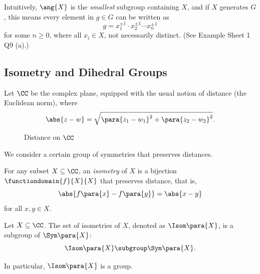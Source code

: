 \begin{remark}
    Intuitively, \(\ang{X}\) is the \emph{smallest} subgroup containing \(X\), and if \(X\) generates \(G\), this means every element in \(g \in G\) can be written as
    \[
        g = x_1^{\pm 1} \cdot x_2^{\pm 1} \cdots x_n^{\pm 1}
    \]
    for some \(n \geq 0\), where all \(x_i \in X\), not necessarily distinct. (See Example Sheet 1 Q9 (a).)
\end{remark}

\subsection{Isometry and Dihedral Groups}
\label{sec:isometry-and-dihedral-groups}

Let \(\CC\) be the complex plane, equipped with the usual notion of distance (the Euclidean norm), where
\[
    \abs{z - w} = \sqrt{\para{z_1 - w_1}^2 + \para{z_2 - w_2}^2}.
\]

\begin{figure}[ht!]
    \centering
    \caption{Distance on \(\CC\)}
    \label{fig:distance-on-C}
\end{figure}

We consider a certain group of symmetries that preserves distances.

\begin{definition}[Isometry]
    \label{def:isometry}%
    For any subset \(X \subseteq \CC\), an \emph{isometry} of \(X\) is a bijection \(\functiondomain{f}{X}{X}\) that preserves distance, that is,
    \[
        \abs{f\para{x} - f\para{y}} = \abs{x - y}
    \]
    for all \(x, y \in X\).
\end{definition}

\begin{proposition}
    \label{prop:isometry-group-in-C}%
    Let \(X \subseteq \CC\). The set of isometries of \(X\), denoted as \(\Isom\para{X}\), is a subgroup of \(\Sym\para{X}\):
    \[
        \Isom\para{X} \subgroup \Sym\para{X}.
    \]

    In particular, \(\Isom\para{X}\) is a group.
\end{proposition}

